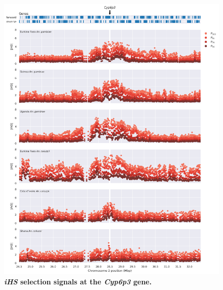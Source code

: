 \documentclass[a4paper,11pt,abstracton,hidelinks]{scrartcl}
\begin{document}
\begin{figure}[t!]
	\begin{center}
		\includegraphics*[width=1.1\linewidth,center]{artwork/locus_cyp6p3_ihs.png}
	\end{center}
	\caption[\textit{iHS} selection signals at the \textit{Cyp6p3} gene]{
	\textbf{\textit{iHS} selection signals at the \textit{Cyp6p3} gene.} 
	} 
	\label{fig:locus_cyp6p3_ihs}
\end{figure}


\clearpage
\end{document}
